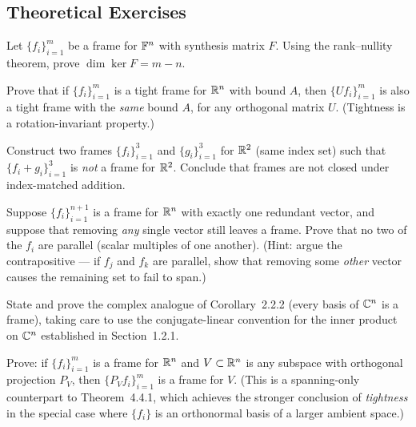 \subsection*{Theoretical Exercises}
\begin{theoexercises}
	\item Let $\{f_i\}_{i=1}^m$ be a frame for $\mathbb{F}^n$ with synthesis matrix
	$F$. Using the rank--nullity theorem, prove
	$\dim\ker F = m-n$.
	
	\item Prove that if $\{f_i\}_{i=1}^m$ is a tight frame for $\mathbb{R}^n$ with
	bound $A$, then $\{Uf_i\}_{i=1}^m$ is also a tight frame with the
	\emph{same} bound $A$, for any orthogonal matrix $U$. (Tightness
	is a rotation-invariant property.)
	
	\item Construct two frames $\{f_i\}_{i=1}^3$ and $\{g_i\}_{i=1}^3$ for
	$\mathbb{R}^2$ (same index set) such that $\{f_i+g_i\}_{i=1}^3$ is
	\emph{not} a frame for $\mathbb{R}^2$. Conclude that frames are not closed
	under index-matched addition.
	
	\item Suppose $\{f_i\}_{i=1}^{n+1}$ is a frame for $\mathbb{R}^n$ with exactly
	one redundant vector, and suppose that removing \emph{any} single
	vector still leaves a frame. Prove that no two of the $f_i$ are
	parallel (scalar multiples of one another). (Hint: argue the
	contrapositive --- if $f_j$ and $f_k$ are parallel, show that
	removing some \emph{other} vector causes the remaining set to fail
	to span.)
	
	\item State and prove the complex analogue of Corollary~2.2.2 (every
	basis of $\mathbb{C}^n$ is a frame), taking care to use the
	conjugate-linear convention for the inner product on $\mathbb{C}^n$
	established in Section~1.2.1.
	
	\item Prove: if $\{f_i\}_{i=1}^m$ is a frame for $\mathbb{R}^n$ and
	$V\subset\mathbb{R}^n$ is any subspace with orthogonal projection $P_V$,
	then $\{P_Vf_i\}_{i=1}^m$ is a frame for $V$. (This is a
	spanning-only counterpart to Theorem~4.4.1, which achieves the
	stronger conclusion of \emph{tightness} in the special case where
	$\{f_i\}$ is an orthonormal basis of a larger ambient space.)
\end{theoexercises}


